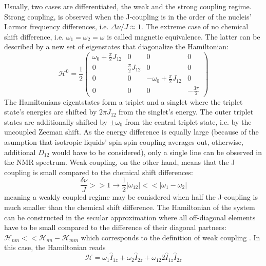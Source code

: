             Usually, two cases are differentiated, the weak and the strong coupling regime. Strong coupling, is observed when the J-coupling is in the order of the nucleis' Larmor frequency differences, i.e. $\Delta \nu / J \approx 1$. The extreme case of no chemical shift difference, i.e. $\omega_1 = \omega_2=\omega$ is called magnetic equivalence.
            The latter can be described by a new set of eigenstates that diagonalize the Hamiltonian:
            \begin{equation}
                \mathcal{H}^0 = \frac{1}{2}
                \begin{pmatrix}
                    \omega_0+ \tfrac{\pi}{2} J_{12} & 0 & 0 & 0\\
                    0 &  \tfrac{\pi}{2}J_{12} & 0 & 0 \\
                    0 & 0 & -\omega_0 + \tfrac{\pi}{2}J_{12} & 0\\
                    0 & 0 & 0 & -\tfrac{3\pi}{2}
                \end{pmatrix}
            \end{equation}
            The Hamiltonians eigentstates form a triplet and a singlet where the triplet state's energies are shifted by $2\pi J_{12}$ from the singlet's energy. The outer triplet states are additionally shifted by $\pm\omega_0$ from the central triplet state, i.e. by the uncoupled Zeeman shift.
            As the energy difference is equally large (because of the asumption that isotropic liquids' spin-spin coupling averages out, otherwise, additional $D_{12}$ would have to be considered), only a single line can be observed in the NMR spectrum.
            Weak coupling, on the other hand, means that the J coupling is small compared to the chemical shift differences:
            \begin{equation*}
                \frac{\delta\nu}{J} >> 1 \rightarrow \frac{1}{2} |\omega_{12}| << |\omega_1-\omega_2|
            \end{equation*}
            meaning a weakly coupled regime may be conisdered when half the J-coupling is much smaller than the chemical shift difference. The Hamiltonian of the system can be constructed in the secular approximation where all off-diagonal elements have to be small compared to the difference of their diagonal partners: $\mathcal{H}_{nm} << \mathcal{H}_{nn} - \mathcal{H}_{mm}$ which corresponds to the definition of weak coupling \cite{levitt_spin_nodate}.
            In this case, the Hamiltonian reads
            \begin{equation}
                \mathcal{H} = \omega_1\hat{I}_{1z} + \omega_2\hat{I}_{2z} + \omega_{12}2\hat{I}_{1z}\hat{I}_{2z}
            \end{equation}
